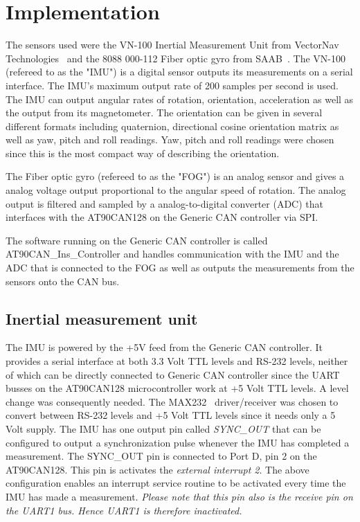 
\section{Implementation}\label{sec:implementation}
The sensors used were the VN-100 Inertial Measurement Unit from VectorNav Technologies~\cite{web:vn100} and the 8088 000-112 Fiber optic gyro from SAAB~\cite{web:fog1}. The VN-100 (refereed to as the "IMU") is a digital sensor outputs its measurements on a serial interface. The IMU's  maximum output rate of 200 samples per second is used. The IMU can output angular rates of rotation, orientation, acceleration as well as the output from its magnetometer. The orientation can be given in several different formats including quaternion, directional cosine orientation matrix as well as yaw, pitch and roll readings. Yaw, pitch and roll readings were chosen since this is the most compact way of describing the orientation.

The Fiber optic gyro (refereed to as the "FOG") is an analog sensor and gives a analog voltage output proportional to the angular speed of rotation. The analog output is filtered and sampled by a analog-to-digital converter (ADC) that interfaces with the AT90CAN128 on the Generic CAN controller via SPI.

The software running on the Generic CAN controller is called AT90CAN\_Ins\_Controller and handles communication with the IMU and the ADC that is connected to the FOG as well as outputs the measurements from the sensors onto the CAN bus.

\subsection{Inertial measurement unit}
The IMU is powered by the +5V feed from the Generic CAN controller. It provides a serial interface at both 3.3 Volt TTL levels and RS-232 levels, neither of which can be directly connected to Generic CAN controller since the UART busses on the AT90CAN128 microcontroller work at +5 Volt TTL levels. A level change was consequently needed. The MAX232~\cite{web:max232} driver/receiver was chosen to convert between RS-232 levels and +5 Volt TTL levels since it needs only a 5 Volt supply. \newline
The IMU has one output pin called \emph{SYNC\_OUT} that can be configured to output a synchronization pulse whenever the IMU has completed a measurement. The SYNC\_OUT pin is connected to Port D, pin 2 on the AT90CAN128. This pin is activates the \emph{external interrupt 2}. \newline
The above configuration enables an interrupt service routine to be activated every time the IMU has made a measurement.\newline 
\emph{Please note that this pin also is the receive pin on the UART1 bus. Hence UART1 is therefore inactivated.} 

